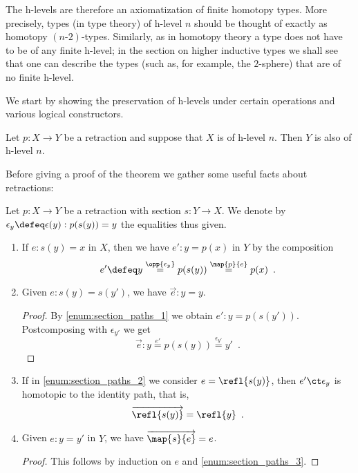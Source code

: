The h-levels are therefore an axiomatization of finite homotopy types. 
More precisely, types (in type theory) of h-level $n$ should be thought of exactly as homotopy $(n\mbox{-}2)$-types. 
Similarly, as in homotopy theory a type does not have to be of any finite h-level; 
in the section on higher inductive types we shall see that one can describe the types (such as, for example, the $2$-sphere) 
that are of no finite h-level.

We start by showing the preservation of h-levels under certain operations and various logical constructors.

\begin{thm}\label{thm:h-level-retracts}
 Let $p \colon X \to Y$ be a retraction and suppose that $X$ is of h-level $n$. Then $Y$ is also of h-level $n$.
\end{thm}

Before giving a proof of the theorem we gather some useful facts about retractions:

\begin{lem}\label{lem:path_retract}
 Let $p \colon X \to Y$ be a retraction with section $s \colon Y \to X$.
 We denote by $\epsilon_y \defeq \epsilon(y) : p(s(y)) = y$ the equalities thus given.
 \begin{enumerate}
  \item \label{enum:section_paths_1}
      If $e : s(y) = x$ in $X$, then we have $e' :  y = p(x)$ in $Y$
        by the composition 
     \[e' \defeq y \stackrel{\opp{\epsilon_y}}{=} p(s(y)) \stackrel{\map{p}{e}}{=} p(x) \enspace .\]
  
  \item \label{enum:section_paths_2}
      Given $e : s(y) = s(y')$, we have $\vec e : y = y$.
     \begin{proof}
	By \ref{enum:section_paths_1} we obtain $e' : y = p(s(y'))$.
        Postcomposing with $\epsilon_{y'}$ we get 
           \[ \overrightarrow{e} : y \stackrel{e'}{=} p(s(y)) \stackrel{\epsilon_{y'}}{=} y' \enspace . \]
     \end{proof}
  
  \item \label{enum:section_paths_3}
        If in \ref{enum:section_paths_2} we consider $e = \refl{s(y)}$, then $e' \ct \epsilon_{y}$
        is homotopic to the identity path, that is,
          \[ \overrightarrow{\refl{s(y)}} = \refl{y} \enspace . \]

  \item Given $e : y = y'$ in $Y$, we have $\overrightarrow{\map{s}{e}} = e$.
      \begin{proof}
       This follows by induction on $e$ and \ref{enum:section_paths_3}.
      \end{proof}

 \end{enumerate}

\end{lem}


